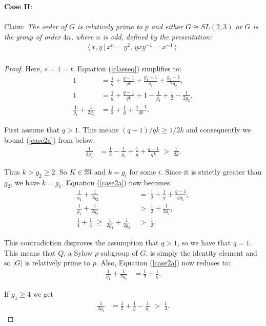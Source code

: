 \documentclass[a4paper , 11pt]{book}
\theoremstyle{definition}
\theoremstyle{remark}
\begin{document}
\textbf{Case II}:\\
\\
Claim: \textit{The order of $G$ is relatively prime to $p$ and either $G \cong SL(2,3)$ or $G$ is the group of order $4n$, where $n$ is odd, defined by the presentation:}
\begin{align*} \langle \, x,y \, | \, x^n = y^2, \, yxy^{-1} = x^{-1} \, \rangle. \\
\end{align*}
\begin{proof} Here, $s = 1 = t$. Equation (\ref{classeq}) simplifies to:
\begin{align}\label{case2a} 1 &= \frac{1}{g} + \frac{q-1}{qk} + \frac{g_1-1}{g_1} +  \frac{g_2-1}{2g_2}, \nonumber
\\ 1 &= \frac{1}{g} + \frac{q-1}{qk} + 1 - \frac{1}{g_1} + \frac{1}{2} - \frac{1}{2g_2}, \nonumber
\\ \frac{1}{g_1}  + \frac{1}{2g_2} &= \frac{1}{2} + \frac{1}{g} + \frac{q-1}{qk}.
\end{align}

First assume that $q>1$. This means $(q-1)/qk \geq 1/2k$ and consequently we bound (\ref{case2a}) from below:
\begin{align*} \frac{1}{2g_2} &= \frac{1}{2} - \frac{1}{g_1} + \frac{1}{g} + \frac{q-1}{qk} \; > \; \frac{1}{2k}.
\end{align*}

Thus $k > g_2 \geq 2$. So $K \in \mathfrak{M}$ and $k=g_i$ for some $i$. Since it is strictly greater than $g_2$, we have $k=g_1$. Equation (\ref{case2a}) now becomes
\begin{align*} \frac{1}{g_1}  + \frac{1}{2g_2} \; &= \; \frac{1}{2} + \frac{1}{g} + \frac{q-1}{qg_1},
\\ \frac{1}{g_1}  + \frac{1}{2g_2} \; &> \; \frac{1}{2} + \frac{1}{2g_1},
\\ \frac{1}{4} + \frac{1}{4} \; \geq \; \frac{1}{2g_1}  + \frac{1}{2g_2} \; &> \; \frac{1}{2}.
\end{align*}

This contradiction disproves the assumption that $q > 1$, so we have that $q = 1$. This means that $Q$, a Sylow $p$-subgroup of $G$, is simply the identity element and so $|G|$ is relatively prime to $p$. Also, Equation (\ref{case2a}) now reduces to:
\begin{align}\label{case2b} \frac{1}{g_1}  + \frac{1}{2g_2} &= \frac{1}{2} + \frac{1}{g}.
\end{align}

If $g_1 \geq 4$ we get
\begin{align*} \frac{1}{2g_2} &= \frac{1}{2} + \frac{1}{g} - \frac{1}{g_1} \; > \; \frac{1}{4}.
\end{align*}


\end{proof}
\end{document}
